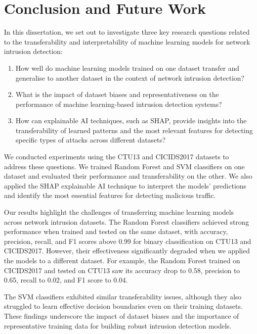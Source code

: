 \chapter{Conclusion and Future Work}\label{chap:conclusion-future-work}

In this dissertation, we set out to investigate three key research questions related to the transferability and interpretability of machine learning models for network intrusion detection:

\begin{enumerate}
    \item How well do machine learning models trained on one dataset transfer and generalise to another dataset in the context of network intrusion detection?
    \item What is the impact of dataset biases and representativeness on the performance of machine learning-based intrusion detection systems?
    \item How can explainable AI techniques, such as SHAP, provide insights into the transferability of learned patterns and the most relevant features for detecting specific types of attacks across different datasets?
\end{enumerate}

We conducted experiments using the CTU13 and CICIDS2017 datasets to address these questions. We trained Random Forest and SVM classifiers on one dataset and evaluated their performance and transferability on the other. We also applied the SHAP explainable AI technique to interpret the models' predictions and identify the most essential features for detecting malicious traffic.

Our results highlight the challenges of transferring machine learning models across network intrusion datasets. The Random Forest classifiers achieved strong performance when trained and tested on the same dataset, with accuracy, precision, recall, and F1 scores above 0.99 for binary classification on CTU13 and CICIDS2017. However, their effectiveness significantly degraded when we applied the models to a different dataset. For example, the Random Forest trained on CICIDS2017 and tested on CTU13 saw its accuracy drop to 0.58, precision to 0.65, recall to 0.02, and F1 score to 0.04.

The SVM classifiers exhibited similar transferability issues, although they also struggled to learn effective decision boundaries even on their training datasets. These findings underscore the impact of dataset biases and the importance of representative training data for building robust intrusion detection models.

